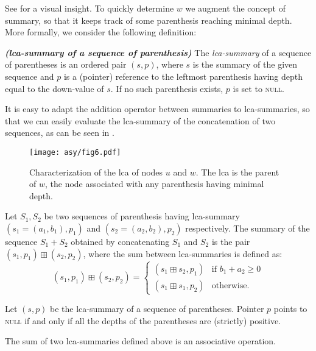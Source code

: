 \documentclass[a4paper,USenglish]{lipics}
\begin{document}
			See  for a visual insight. To quickly determine $w$ we augment the concept of summary, so that it keeps track of some parenthesis reaching minimal depth. More formally, we consider the following definition:
			\begin{definition}\hspace{0mm}\emph{\textbf{(lca-summary of a sequence of parenthesis)}}
				The \emph{lca-summary} of a sequence of parentheses is an ordered pair $(s,p)$, where $s$ is the summary of the given sequence and $p$ is a (pointer) reference to the leftmost parenthesis having depth equal to the down-value of $s$. If no such parenthesis exists, $p$ is set to \textsc{null}.
			\end{definition}
			
			It is easy to adapt the addition operator between summaries to lca-summaries, so that we can easily evaluate the lca-summary of the concatenation of two sequences, as can be seen in .

			\begin{figure}[t]

				\texttt{[image: asy/fig6.pdf]}\\
				\caption{Characterization of the lca of nodes $u$ and $w$. The lca is the parent of $w$, the node associated with any parenthesis having minimal depth.\label{fig:lca}}

			\end{figure}

			\begin{lemma}
				\label{prop:sum of lca-summaries}
				Let $S_1, S_2$ be two sequences of parenthesis having lca-summary $(s_1=(a_1,b_1),p_1)$ and $(s_2=(a_2,b_2),p_2)$ respectively. The summary of the sequence $S_1 + S_2$ obtained by concatenating $S_1$ and $S_2$ is the pair $(s_1,p_1) \boxplus (s_2,p_2)$, where the sum between lca-summaries is defined as:
				$$ (s_1,p_1) \boxplus (s_2,p_2) = \begin{cases}
					(s_1 \boxplus s_2, p_1) & \text{if }b_1 + a_2 \ge 0\\
					(s_1 \boxplus s_1, p_2) & \text{otherwise.}
				\end{cases}
				$$
			\end{lemma}
			\begin{lemma}
				\label{prop:pointer to null}
				Let $(s, p)$ be the lca-summary of a sequence of parentheses. Pointer $p$ points to \textsc{null} if and only if all the depths of the parentheses are (strictly) positive.
			\end{lemma}
			\begin{lemma}
				\label{prop:lca-summary sum associativity}
				The sum of two lca-summaries defined above is an associative operation.
			\end{lemma}
			
\end{document}
